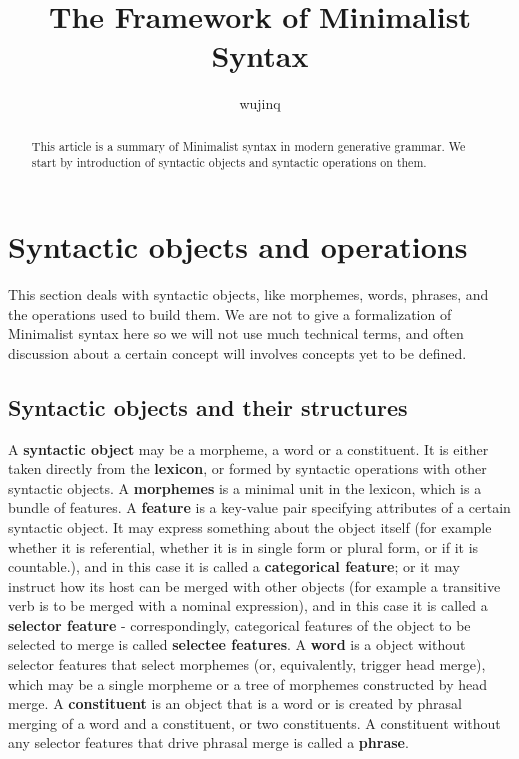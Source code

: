 \documentclass[a4paper]{article}
\title{The Framework of Minimalist Syntax}
\author{wujinq}
\begin{document}
\maketitle

\begin{abstract}
    This article is a summary of Minimalist syntax in modern generative grammar.
    We start by introduction of syntactic objects and syntactic operations on them.
\end{abstract}

\section{Syntactic objects and operations}\label{sec:syn-obj}

This section deals with syntactic objects, like morphemes, words, phrases, and the operations used to build them.
We are not to give a formalization of Minimalist syntax here so we will not use much technical terms, 
and often discussion about a certain concept will involves concepts yet to be defined.

\subsection{Syntactic objects and their structures}

A \textbf{syntactic object} may be a morpheme, a word or a constituent.
It is either taken directly from the \textbf{lexicon}, 
or formed by syntactic operations with other syntactic objects.
A \textbf{morphemes} is a minimal unit in the lexicon, which is a bundle of features.
A \textbf{feature} is a key-value pair specifying attributes of a certain syntactic object.
It may express something about the object itself 
(for example whether it is referential, whether it is in single form or plural form, or if it is countable.), 
and in this case it is called a \textbf{categorical feature};
or it may instruct how its host can be merged with other objects 
(for example a transitive verb is to be merged with a nominal expression), 
and in this case it is called a \textbf{selector feature}
 - correspondingly, categorical features of the object to be selected to merge is called \textbf{selectee features}.
A \textbf{word} is a object without selector features that select morphemes (or, equivalently, trigger head merge), 
which may be a single morpheme or a tree of morphemes constructed by head merge.
A \textbf{constituent} is an object 
that is a word or is created by phrasal merging of a word and a constituent, or two constituents.
A constituent without any selector features that drive phrasal merge is called a \textbf{phrase}.
\end{document}
